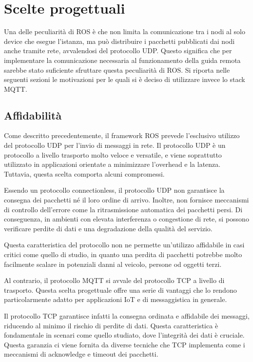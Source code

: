 \chapter{Scelte progettuali}
Una delle peculiarità di ROS è che non limita la comunicazione tra i nodi al solo device che esegue l'istanza, ma può distribuire i pacchetti pubblicati dai nodi anche tramite rete, avvalendosi del protocollo UDP. 
Questo significa che per implementare la comunicazione necessaria al funzionamento della guida remota sarebbe stato suficiente sfruttare questa peculiarità di ROS. Si riporta nelle seguenti sezioni le motivazioni per le quali si è deciso di utilizzare invece lo stack MQTT.

\section{Affidabilità} \label{scelte_progettuali_affidabilità}
Come descritto precedentemente, il framework ROS prevede l'esclusivo utilizzo del protocollo UDP per l'invio di messaggi in rete. Il protocollo UDP è un protocollo a livello trasporto molto veloce e versatile, e viene soprattutto utilizzato in applicazioni orientate a minimizzare l'overhead e la latenza. Tuttavia, questa scelta comporta alcuni compromessi. 

\noindent Essendo un protocollo connectionless, il protocollo UDP non garantisce la consegna dei pacchetti né il loro ordine di arrivo. Inoltre, non fornisce meccanismi di controllo dell'errore come la ritrasmissione automatica dei pacchetti persi. Di conseguenza, in ambienti con elevata interferenza o congestione di rete, si possono verificare perdite di dati e una degradazione della qualità del servizio.

\noindent Questa caratteristica del protocollo non ne permette un'utilizzo affidabile in casi critici come quello di studio, in quanto una perdita di pacchetti potrebbe molto facilmente scalare in potenziali danni al veicolo, persone od oggetti terzi.

\noindent Al contrario, il protocollo MQTT si avvale del protocollo TCP a livello di trasporto. Questa scelta progettuale offre una serie di vantaggi che lo rendono particolarmente adatto per applicazioni IoT e di messaggistica in generale.

\noindent Il protocollo TCP garantisce infatti la consegna ordinata e affidabile dei messaggi, riducendo al minimo il rischio di perdite di dati. Questa caratteristica è fondamentale in scenari come quello studiato, dove l'integrità dei dati è cruciale. Questa garanzia ci viene fornita da diverse tecniche che TCP implementa come i meccanismi di acknowledge e timeout dei pacchetti. 

